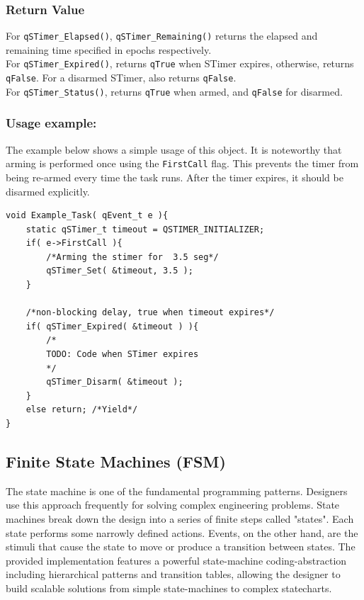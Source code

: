 \documentclass{article}
\begin{document}
\subsubsection*{Return Value}
For \lstinline{qSTimer_Elapsed()}, \lstinline{qSTimer_Remaining()} returns the elapsed and remaining time specified in epochs respectively. \\
For \lstinline{qSTimer_Expired()}, returns \lstinline{qTrue} when STimer expires, otherwise, returns \lstinline{qFalse}. For a disarmed STimer, also returns \lstinline{qFalse}. \\
For \lstinline{qSTimer_Status()}, returns \lstinline{qTrue} when armed, and \lstinline{qFalse} for disarmed.

\noindent\hrulefill

\subsubsection*{Usage example:}
The example below shows a simple usage of this object. It is noteworthy that arming is performed once using the \lstinline{FirstCall} flag. This prevents the timer from being re-armed every time the task runs. After the timer expires, it should be disarmed explicitly. \\


\begin{lstlisting}[style=CStyle]
void Example_Task( qEvent_t e ){
    static qSTimer_t timeout = QSTIMER_INITIALIZER;
    if( e->FirstCall ){
        /*Arming the stimer for  3.5 seg*/
        qSTimer_Set( &timeout, 3.5 );
    }
    
    /*non-blocking delay, true when timeout expires*/
    if( qSTimer_Expired( &timeout ) ){
        /*
        TODO: Code when STimer expires
        */    
        qSTimer_Disarm( &timeout );
    }
    else return; /*Yield*/
}
\end{lstlisting}  

\subsection{Finite State Machines (FSM)}
The state machine is one of the fundamental programming patterns. Designers use this approach frequently for solving complex engineering problems. State machines break down the design into a series of finite steps called "states". Each state performs some narrowly defined actions. Events, on the other hand, are the stimuli that cause the state to move or produce a transition between states. 
The provided implementation features a powerful state-machine coding-abstraction including hierarchical patterns and transition tables, allowing the designer to build scalable solutions from simple state-machines to complex statecharts. 
\end{document}
